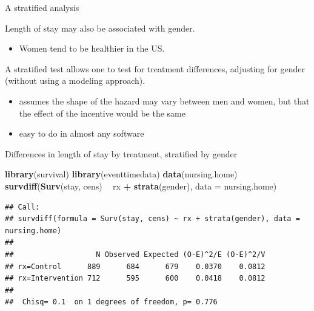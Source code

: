 \documentclass[ignorenonframetext,]{beamer}
\newenvironment{Shaded}{\begin{snugshade}}{\end{snugshade}}
\newcommand{\DataTypeTok}[1]{\textcolor[rgb]{0.13,0.29,0.53}{#1}}
\newcommand{\KeywordTok}[1]{\textcolor[rgb]{0.13,0.29,0.53}{\textbf{#1}}}
\newcommand{\NormalTok}[1]{#1}
\newcommand{\OperatorTok}[1]{\textcolor[rgb]{0.81,0.36,0.00}{\textbf{#1}}}
\newcommand{\StringTok}[1]{\textcolor[rgb]{0.31,0.60,0.02}{#1}}
\providecommand{\tightlist}{%
  \setlength{\itemsep}{0pt}\setlength{\parskip}{0pt}}
\begin{document}
\begin{frame}{%
\protect\hypertarget{a-stratified-analysis}{%
A stratified analysis}}

Length of stay may also be associated with gender.

\begin{itemize}
\tightlist
\item
  Women tend to be healthier in the US.
\end{itemize}

A stratified test allows one to test for treatment differences,
adjusting for gender (without using a modeling approach).

\begin{itemize}
\item
  assumes the shape of the hazard may vary between men and women, but
  that the effect of the incentive would be the same
\item
  easy to do in almost any software
\end{itemize}

\end{frame}

\begin{frame}[fragile]{%
\protect\hypertarget{differences-in-length-of-stay-by-treatment-stratified-by-gender}{%
Differences in length of stay by treatment, stratified by gender}}

\footnotesize

\begin{Shaded}
\begin{Highlighting}[]
\KeywordTok{library}\NormalTok{(survival)}
\KeywordTok{library}\NormalTok{(eventtimedata)}
\KeywordTok{data}\NormalTok{(nursing.home)}
\KeywordTok{survdiff}\NormalTok{(}\KeywordTok{Surv}\NormalTok{(stay, cens) }\OperatorTok{~}\StringTok{ }\NormalTok{rx }\OperatorTok{+}\StringTok{ }\KeywordTok{strata}\NormalTok{(gender), }
         \DataTypeTok{data =}\NormalTok{ nursing.home)}
\end{Highlighting}
\end{Shaded}

\begin{verbatim}
## Call:
## survdiff(formula = Surv(stay, cens) ~ rx + strata(gender), data = nursing.home)
## 
##                   N Observed Expected (O-E)^2/E (O-E)^2/V
## rx=Control      889      684      679    0.0370    0.0812
## rx=Intervention 712      595      600    0.0418    0.0812
## 
##  Chisq= 0.1  on 1 degrees of freedom, p= 0.776
\end{verbatim}

\end{frame}
\end{document}
